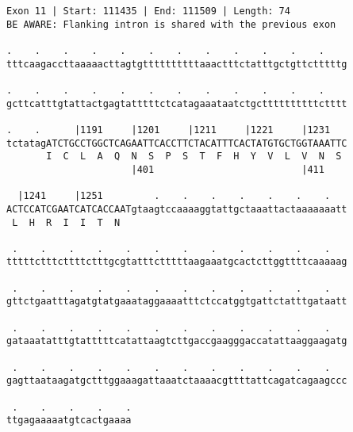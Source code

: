 \documentclass{article}
\begin{document}
\begin{Verbatim}[fontfamily=courier]
Exon 11 | Start: 111435 | End: 111509 | Length: 74
BE AWARE: Flanking intron is shared with the previous exon

.    .    .    .    .    .    .    .    .    .    .    .    
tttcaagaccttaaaaacttagtgttttttttttaaactttctatttgctgttctttttg

.    .    .    .    .    .    .    .    .    .    .    .    
gcttcatttgtattactgagtatttttctcatagaaataatctgcttttttttttctttt

.    .      |1191     |1201     |1211     |1221     |1231   
tctatagATCTGCCTGGCTCAGAATTCACCTTCTACATTTCACTATGTGCTGGTAAATTC
       I  C  L  A  Q  N  S  P  S  T  F  H  Y  V  L  V  N  S 
                      |401                          |411    

  |1241     |1251         .    .    .    .    .    .    .   
ACTCCATCGAATCATCACCAATgtaagtccaaaaggtattgctaaattactaaaaaaatt
 L  H  R  I  I  T  N                                        

 .    .    .    .    .    .    .    .    .    .    .    .   
tttttctttcttttctttgcgtatttctttttaagaaatgcactcttggttttcaaaaag

 .    .    .    .    .    .    .    .    .    .    .    .   
gttctgaatttagatgtatgaaataggaaaatttctccatggtgattctatttgataatt

 .    .    .    .    .    .    .    .    .    .    .    .   
gataaatatttgtatttttcatattaagtcttgaccgaagggaccatattaaggaagatg

 .    .    .    .    .    .    .    .    .    .    .    .   
gagttaataagatgctttggaaagattaaatctaaaacgttttattcagatcagaagccc

 .    .    .    .    .
ttgagaaaaatgtcactgaaaa
\end{Verbatim}
\newpage
\end{document}
